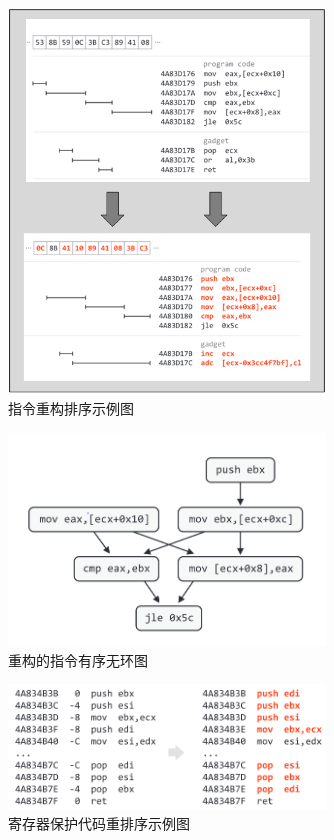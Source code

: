 \begin{figure}[hbt]
	\centering
	\includegraphics[width=0.75\textwidth]{figures/4.3}
	\caption{指令重构排序示例图}\label{fig:4.3}
\end{figure}

\begin{figure}[hbt]
	\centering
	\includegraphics[width=0.75\textwidth]{figures/4.4}
	\caption{重构的指令有序无环图}\label{fig:4.4}
\end{figure}

\begin{figure}[hbt]
	\centering
	\includegraphics[width=0.75\textwidth]{figures/4.5}
	\caption{寄存器保护代码重排序示例图}\label{fig:4.5}
\end{figure}

